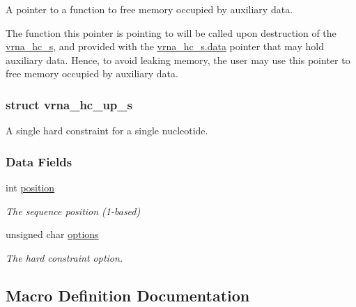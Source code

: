 A pointer to a function to free memory occupied by auxiliary data. 

The function this pointer is pointing to will be called upon destruction of the \hyperlink{group__hard__constraints_structvrna__hc__s}{vrna\+\_\+hc\+\_\+s}, and provided with the \hyperlink{group__hard__constraints_acef3d722142cb5f4a8e114e5fbce3b1a}{vrna\+\_\+hc\+\_\+s.\+data} pointer that may hold auxiliary data. Hence, to avoid leaking memory, the user may use this pointer to free memory occupied by auxiliary data. \label{structvrna__hc__up__s}
\subsubsection{struct vrna\+\_\+hc\+\_\+up\+\_\+s}
A single hard constraint for a single nucleotide. \subsubsection*{Data Fields}
\begin{DoxyCompactItemize}
\item 
\mbox{\label{group__hard__constraints_a67a98def263c534a8c57298098da16e8}} 
int \hyperlink{group__hard__constraints_a67a98def263c534a8c57298098da16e8}{position}
\begin{DoxyCompactList}\small\item\em The sequence position (1-\/based) \end{DoxyCompactList}\item 
\mbox{\label{group__hard__constraints_a468414760f373f7dc0eb1fd47cf708d0}} 
unsigned char \hyperlink{group__hard__constraints_a468414760f373f7dc0eb1fd47cf708d0}{options}
\begin{DoxyCompactList}\small\item\em The hard constraint option. \end{DoxyCompactList}\end{DoxyCompactItemize}


\subsection{Macro Definition Documentation}
\mbox{\label{group__hard__constraints_ga4bfc2f15c4f261c62a11af9d2aa80c90}} 
